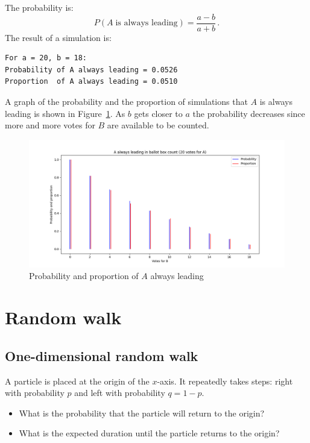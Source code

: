 \documentclass[11pt,a4paper]{article}
\newcommand*{\disfrac}[2]{\displaystyle\frac{#1}{#2}}
\begin{document}
The probability is:
\[
P(A \;\textrm{is always leading}) = \disfrac{a-b}{a+b}\,.
\]
The result of a simulation is:
\begin{verbatim}
For a = 20, b = 18:
Probability of A always leading = 0.0526
Proportion  of A always leading = 0.0510
\end{verbatim}
A graph of the probability and the proportion of simulations that $A$ is always leading is shown in Figure~\ref{f.ballot-01}. As $b$ gets closer to $a$ the probability decreases since more and more votes for $B$ are available to be counted.
\begin{figure}
\begin{center}
\includegraphics[width=\textwidth]{ballot-01}
\caption{Probability and proportion of $A$ always leading}\label{f.ballot-01}
\end{center}
\end{figure}


\section{Random walk}\label{s.walk}

\subsection{One-dimensional random walk}

A particle is placed at the origin of the $x$-axis. It repeatedly takes steps: right with probability $p$ and left with probability $q=1-p$.
\begin{center}
\end{center}
\begin{itemize}
\item What is the probability that the particle will return to the origin?
\item What is the expected duration until the particle returns to the origin?
\end{itemize}
\end{document}
